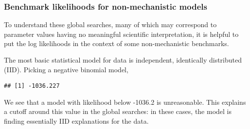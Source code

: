 \begin{frame}[fragile]

\frametitle{Benchmark likelihoods for non-mechanistic models}

\bi
\item To understand these global searches, many of which may correspond to parameter values having no meaningful scientific interpretation, it is helpful to put the log likelihoods in the context of some non-mechanistic benchmarks.

\item The most basic statistical model for data is independent, identically distributed (IID). Picking a negative binomial model, 

\ei

\begin{knitrout}\small
{}\color{fgcolor}\begin{kframe}
\begin{alltt}
 \hlkwb{<-} \hlstd{(}\hlstd{)} \hlopt{-}\hlstd{(}\hlstd{(}\hlstd{(}
  \hlstd{=}\hlstd{(theta[}\hlstd{]),}\hlstd{=}\hlstd{(theta[}\hlstd{]),}\hlstd{=}\hlstd{))}
 \hlkwb{<-} \hlstd{(}\hlstd{(}\hlstd{,}\hlopt{-}
\hlopt{-}\hlopt{$}
\end{alltt}
\begin{verbatim}
## [1] -1036.227
\end{verbatim}
\end{kframe}
\end{knitrout}

\bi

\item We see that a model with likelihood below -1036.2 is unreasonable. This explains a cutoff around this value in the global searches: in these cases, the model is finding essentially IID explanations for the data.

\ei

\end{frame}


